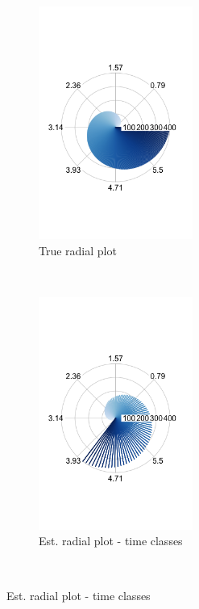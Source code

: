 \documentclass[11pt]{article}
\begin{document}
\begin{figure}[ht]
    \centering    
     \begin{subfigure}[t]{0.5\textwidth}
        \centering
        \includegraphics[height=3in]{../figures/cell_order_R_figs/original_cell_order.png}
        \caption{True radial plot}
    \end{subfigure}%
    ~
    \begin{subfigure}[t]{0.5\textwidth}
        \centering
        \includegraphics[height=3in]{../figures/cell_order_R_figs/estd_cell_order_100_classes.png}
        \caption{Est. radial plot - time classes}
    \end{subfigure}\\
    

\end{figure}
\end{document}
